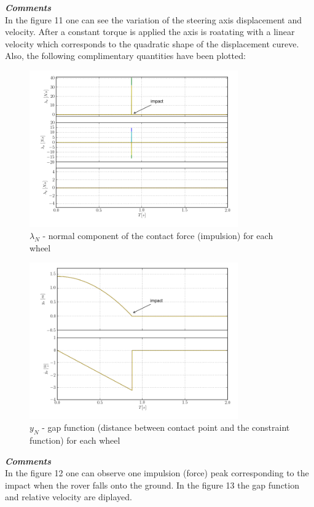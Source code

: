 \noindent \textbf{\textit{\Large{Comments}}}\\[1mm]
\noindent In the figure 11 one can see the variation of the steering axis displacement and velocity. After a constant torque is applied the axis is roatating with a linear velocity which corresponds to the quadratic
shape of the displacement cureve.\\

\noindent Also, the following complimentary quantities have been plotted:

\begin{figure}[H]
  \centering
    \includegraphics[width=0.8\textwidth]{lambdaNTS2}
  \caption{$\lambda_{N}$ - normal component of the contact force (impulsion) for each wheel}
\end{figure}

\begin{figure}[H]
  \centering
    \includegraphics[width=0.8\textwidth]{yNyNdot2}
  \caption{$y_{N}$ - gap function (distance between contact point and the constraint function) for each wheel}
\end{figure}

\noindent \textbf{\textit{\Large{Comments}}}\\[1mm]
\noindent In the figure 12 one can observe one impulsion (force) peak corresponding to the impact when the rover falls onto the ground. In the figure 13 the gap function and relative velocity are diplayed.

